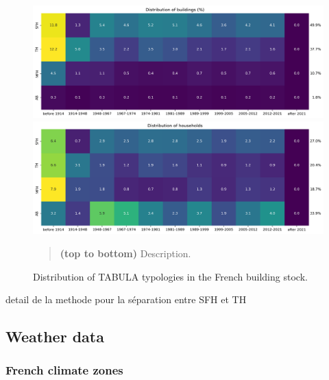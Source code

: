 \documentclass[11pt]{article}
\begin{document}
        \begin{figure}[ht]
            \centering
            \includegraphics[width=0.99\columnwidth]{figures/bgc_distribution_tabula_buildings_ponderated.png}\\
            \includegraphics[width=0.99\columnwidth]{figures/bgc_distribution_tabula_households_ponderated.png}
            \caption{\label{fig:tab_stock} Distribution of TABULA typologies in the French building stock.}
            \begin{quote}
                \vspace{-2mm}
                \small\noindent
                \textbf{(top to bottom)} Description.  
              \end{quote}
        \end{figure}

        detail de la methode pour la séparation entre SFH et TH

        






    


    \subsection{Weather data} %
    \label{sub:weather_data}

        \subsubsection{French climate zones} %
        \label{ssub:french_climate_zones}
\end{document}
